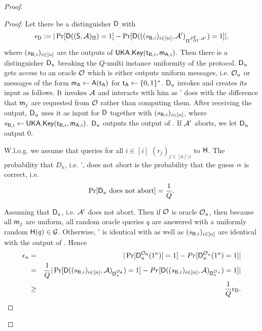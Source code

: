 \begin{proof}
\begin{proof}
Let there be a distinguisher $\mathsf D$ with
$$
\epsilon_{\mathsf D}:=|\Pr[\mathsf D((\mathsf{S}, \mathcal{A})_{\Pi})=1] -\Pr[\mathsf D(((s_{\mathsf{B},i})_{i\in[n]},\mathcal{A}')_{\Pi^{ \mathcal{F}_{\mathsf{OT}}^\mathsf{E} , \mathcal{A}'}})=1]|,
$$
where $(s_{\mathsf{B},i})_{i\in[n]}$ are the outputs of $\mathsf{UKA}.\mathsf{Key}(\mathsf{t}_{\mathsf{B},i},\mathsf{m}_{\mathsf{A},i})$. Then there is a distinguisher $\mathsf D_u$ breaking the $Q$-multi instance uniformity of the \UKA protocol. $\mathsf D_u$ gets access to an oracle $\mathcal{O}$ which is either outputs uniform messages, i.e. $\mathcal{O}_u$ or messages of  the form $\mathsf{m}_\mathsf{A}\leftarrow\mathsf{A}(\mathsf{t}_\mathsf{A})$ for $\mathsf{t}_\mathsf{A}\leftarrow\{0,1\}^*$. $\mathsf D_u$ invokes \D and creates its input as follows. It invokes $\mathcal{A}$ and interacts with him as \Adv' does with the difference that $\mathsf{m}_j$ are requested from $\mathcal{O}$ rather than computing them.  After receiving the output, $\mathsf D_u$ uses it as input for $\mathsf D$ together with $(s_{\mathsf{B},i})_{i\in[n]}$, where $s_{\mathsf{B},i}\leftarrow\mathsf{UKA}.\mathsf{Key}(\mathsf{t}_{\mathsf{B},i},\mathsf{m}_{\mathsf{A},i})$. $\mathsf D_u$ outputs the output of \D. If $\mathcal{A}'$ aborts, we let $\mathsf D_u$ output $0$.

W.l.o.g. we assume that \Adv queries for all $i\in[i]$ $(r_j)_{j\in[n]\setminus{i}}$ to $\mathsf{H}$. The probability that $D_u$, i.e. \Adv', does not abort is the probability that the guess $\alpha$ is correct, i.e.
$$
\Pr[\mathsf D_u\text{ does not abort}]=\frac{1}{Q}.
$$

Assuming that $\mathsf D_u$, i.e. $\mathcal{A}'$ does not abort. Then if $\mathcal{O}$ is oracle $\mathcal{O}_{u}$, then because all $\mathsf{m}_j$ are uniform, all random oracle queries $q$ are answered with a uniformly random $\mathsf{H}(q)\in\mathcal{G}$.  Otherwise, \Adv' is identical with \send as well as $(s_{\mathsf{B},i})_{i\in[n]}$ are identical with the output of \send.  
Hence 
\begin{eqnarray*}
\epsilon_{u}&=&|\Pr[\mathsf D_u^{\mathcal{O}_{\mathsf{A}}}(1^{\kappa})]=1]-Pr[\mathsf D_u^{\mathcal{O}_{u}}(1^{\kappa})=1]|\\
&= &\frac{1}{Q}|\Pr[\mathsf D((s_{\mathsf{B},i})_{i\in[n]},\mathcal{A})_{\mathsf D_u^{\mathcal{O}_{\mathsf{A}}}})=1]-Pr[\mathsf D((s_{\mathsf{B},i})_{i\in[n]},\mathcal{A})_{\mathsf D_u^{\mathcal{O}_{u}}})=1]|\\
&\geq&\frac{1}{Q}\epsilon_{\mathsf D}.
\end{eqnarray*}




\end{proof}
\end{proof}

